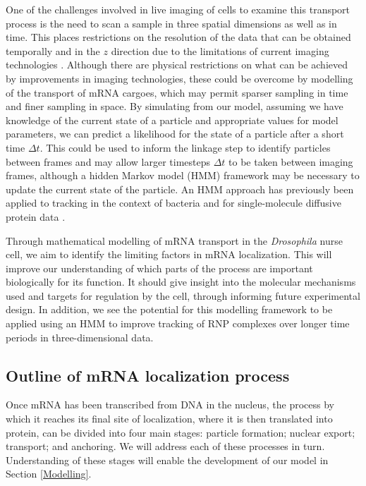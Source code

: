 \documentclass[twocolumn]{biophys}
\begin{document}
One of the challenges involved in live imaging of cells to examine this transport process is the need to scan a sample in three spatial dimensions as well as in time.
This places restrictions on the resolution of the data that can be obtained temporally and in the $z$ direction due to the limitations of current imaging technologies \citep{weil2010making}.
Although there are physical restrictions on what can be achieved by improvements in imaging technologies, these could be overcome by modelling of the transport of mRNA cargoes, which may permit sparser sampling in time and finer sampling in space.
By simulating from our model, assuming we have knowledge of the current state of a particle and appropriate values for model parameters, we can predict a likelihood for the state of a particle after a short time $\Delta t$.
This could be used to inform the linkage step to identify particles between frames and may allow larger timesteps $\Delta t$ to be taken between imaging frames, although a hidden Markov model (HMM) framework may be necessary to update the current state of the particle.
An HMM approach has previously been applied to tracking in the context of bacteria \citep{rosser2013novel} and for single-molecule diffusive protein data \citep{persson2013extracting}.

Through mathematical modelling of mRNA transport in the \textit{Drosophila} nurse cell, we aim to identify the limiting factors in mRNA localization.
This will improve our understanding of which parts of the process are important biologically for its function.
It should give insight into the molecular mechanisms used and targets for regulation by the cell, through informing future experimental design.
In addition, we see the potential for this modelling framework to be applied using an HMM to improve tracking of RNP complexes over longer time periods in three-dimensional data.

\subsection{Outline of mRNA localization process} \label{Outline}

Once mRNA has been transcribed from DNA in the nucleus, the process by which it reaches its final site of localization, where it is then translated into protein, can be divided into four main stages: particle formation; nuclear export; transport; and anchoring.
We will address each of these processes in turn.
Understanding of these stages will enable the development of our model in Section \ref{Modelling}.
\end{document}
